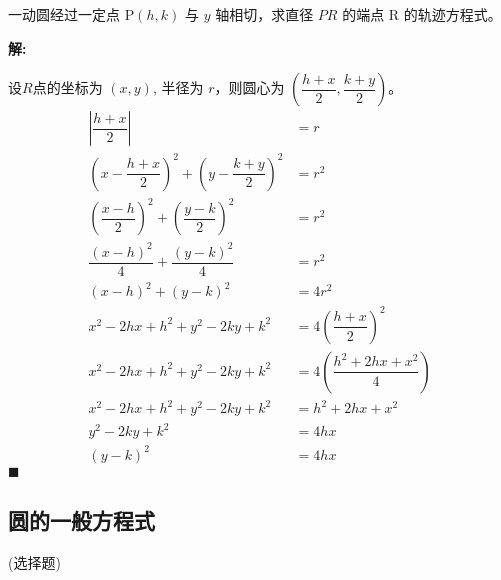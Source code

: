 \documentclass[10pt]{article}
\newcommand{\sol}{\textbf{解:} }
\begin{document}
\begin{enumerate}[leftmargin=*]
  一动圆经过一定点 $\mathrm{P}(h, k)$ 与 $y$ 轴相切，求直径 $PR$ 的端点 $\mathrm{R}$ 的轨迹方程式。

  \sol{}

  设$R$点的坐标为 $(x, y)$, 半径为 $r$，则圆心为 $\left(\dfrac{h+x}{2}, \dfrac{k+y}{2}\right)$。
  \begin{align*}
    \left|\dfrac{h+x}{2}\right| &= r\\
    \left(x-\dfrac{h+x}{2}\right)^{2} + \left(y-\dfrac{k+y}{2}\right)^{2} &= r^{2}\\
    \left(\dfrac{x-h}{2}\right)^{2} + \left(\dfrac{y-k}{2}\right)^{2} &= r^{2}\\
    \dfrac{(x-h)^{2}}{4} + \dfrac{(y-k)^{2}}{4} &= r^{2}\\
    (x-h)^{2} + (y-k)^{2} &= 4r^{2}\\
    x^{2} - 2hx + h^{2} + y^{2} - 2ky + k^{2} &= 4\left(\dfrac{h+x}{2}\right)^{2}\\
    x^{2} - 2hx + h^{2} + y^{2} - 2ky + k^{2} &= 4\left(\dfrac{h^{2}+2hx+x^{2}}{4}\right)\\
    x^{2} - 2hx + h^{2} + y^{2} - 2ky + k^{2} &= h^{2} + 2hx + x^{2}\\
     y^{2} - 2ky + k^{2} &= 4hx\\
     (y-k)^{2} &= 4hx
  \end{align*} \hfill$\blacksquare$

\end{enumerate}

\subsection{圆的一般方程式}
(选择题)
\end{document}
